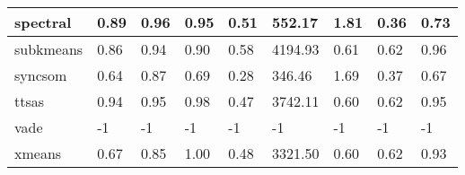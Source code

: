 \begin{table}[H]
\begin{tabular}{|l|l|l|l|l|l|l|l|l|}
\hline
spectral & 0.89 & 0.96 & 0.95 & 0.51 & 552.17 & 1.81 & 0.36 & 0.73 \\
\hline
subkmeans & 0.86 & 0.94 & 0.90 & 0.58 & 4194.93 & 0.61 & 0.62 & 0.96 \\
\hline
syncsom & 0.64 & 0.87 & 0.69 & 0.28 & 346.46 & 1.69 & 0.37 & 0.67 \\
\hline
ttsas & 0.94 & 0.95 & 0.98 & 0.47 & 3742.11 & 0.60 & 0.62 & 0.95 \\
\hline
vade & -1 & -1 & -1 & -1 & -1 & -1 & -1 & -1 \\
\hline
xmeans & 0.67 & 0.85 & 1.00 & 0.48 & 3321.50 & 0.60 & 0.62 & 0.93 \\
\hline
\end{tabular}
\end{table}
